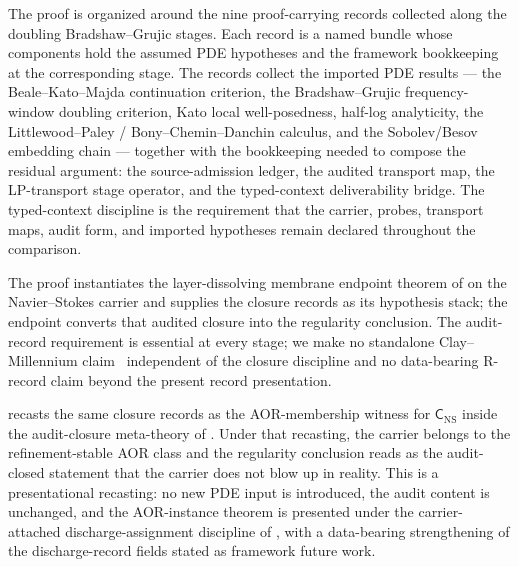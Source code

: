 \documentclass[11pt]{article}
\theoremstyle{definition}
\begin{document}
The proof is organized around the nine proof-carrying records collected
along the doubling Bradshaw--Grujic stages.  Each record is a named
bundle whose components hold the assumed PDE hypotheses and the
framework bookkeeping at the corresponding stage.  The records collect
the imported PDE results --- the Beale--Kato--Majda continuation
criterion, the Bradshaw--Grujic frequency-window doubling criterion,
Kato local well-posedness, half-log analyticity, the
Littlewood--Paley / Bony--Chemin--Danchin calculus, and the
Sobolev/Besov embedding chain --- together with the bookkeeping needed
to compose the residual argument: the source-admission ledger, the
audited transport map, the LP-transport stage operator, and the
typed-context deliverability bridge.  The typed-context discipline is
the requirement that the carrier, probes, transport maps, audit form,
and imported hypotheses remain declared throughout the comparison.

The proof instantiates the layer-dissolving membrane endpoint theorem
of \citet{Tsiokos2026NeedleKiller} on the Navier--Stokes carrier and
supplies the closure records as its hypothesis stack; the endpoint
converts that audited closure into the regularity conclusion.  The
audit-record requirement is essential at every stage; we make no
standalone Clay--Millennium
claim~\citep{Fefferman2000NavierStokes} independent of the closure
discipline and no data-bearing R-record claim beyond the present
record presentation.

 recasts the same closure records as the
AOR-membership witness for \(\mathsf C_{\mathrm{NS}}\) inside the
audit-closure meta-theory of \citet{Tsiokos2026AOR}.  Under that
recasting, the carrier belongs to the refinement-stable AOR class and
the regularity conclusion reads as the audit-closed statement that
the carrier does not blow up in reality.  This is a presentational
recasting: no new PDE input is introduced, the audit content is
unchanged, and the AOR-instance theorem
 is presented under the
carrier-attached discharge-assignment discipline of
\citet{Tsiokos2026AOR}, with a data-bearing strengthening of
the discharge-record fields stated as framework future work.
\end{document}
